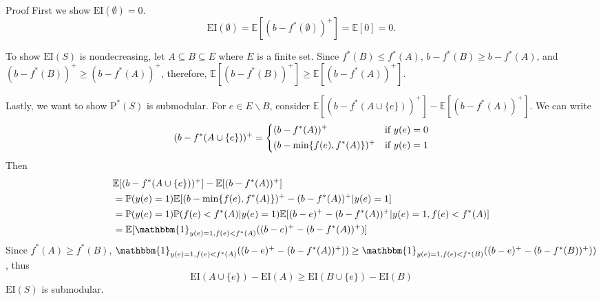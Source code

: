 \documentclass[opre,nonblindrev]{informs3} %
\newcommand{\E}{\mathbb{E}}
\newcommand{\EI}{\mathrm{EI}}
\newcommand{\PI}{\text{P}^*}
\begin{document}
\begin{APPENDIX}{Proof}
First we show $\EI(\emptyset) = 0$.
\begin{equation*}
  \EI(\emptyset) = \E[(b-f^*(\emptyset))^+] = \E[0] = 0.
\end{equation*}

To show $\EI(S)$ is nondecreasing, let $A \subseteq B \subseteq E$ where $E$ is a finite set. Since $f^*(B) \leq f^*(A)$, $b-f^*(B) \geq b-f^*(A)$, and $(b-f^*(B))^+ \geq (b-f^*(A))^+$, therefore, $\E[(b-f^*(B))^+] \geq \E[(b-f^*(A))^+]$.

Lastly, we want to show $\PI(S)$ is submodular. For $e \in E\backslash B$, consider $\E[(b-f^*(A \cup \{e\}))^+]-\E[(b-f^*(A))^+]$. We can write
\begin{equation*}
(b-f^*(A \cup \{e\}))^+ = \begin{dcases}
                         (b-f^*(A))^+ & \text{if $y(e)=0$} \\
                         (b-\min\{f(e),f^*(A)\})^+ & \text{if $y(e)=1$}
                         \end{dcases}
\end{equation*}
Then 
\begin{align*}
&\E[(b-f^*(A \cup \{e\}))^+]-\E[(b-f^*(A))^+] \\
&= \mathbb{P}(y(e)=1) \E[(b-\min\{f(e),f^*(A)\})^+ -(b-f^*(A))^+|y(e)=1]\\
&= \mathbb{P}(y(e)=1) \mathbb{P}(f(e)<f^*(A)|y(e)=1) \E[(b-e)^+-(b-f^*(A))^+|y(e)=1, f(e)<f^*(A)]\\
&= \E[ \mathbbm{1}_{y(e)=1, f(e)<f^*(A)} ((b-e)^+-(b-f^*(A))^+)]
\end{align*}
Since $f^*(A) \geq f^*(B)$, $\mathbbm{1}_{y(e)=1, f(e)<f^*(A)} ((b-e)^+-(b-f^*(A))^+)) \geq \mathbbm{1}_{y(e)=1, f(e)<f^*(B)} ((b-e)^+-(b-f^*(B))^+))$, thus
\begin{equation*}
\EI(A\cup \{e\})-\EI(A) \geq \EI(B\cup \{e\})-\EI(B)
\end{equation*}
$\EI(S)$ is submodular. \Halmos
\endproof


\end{APPENDIX}
\end{document}
